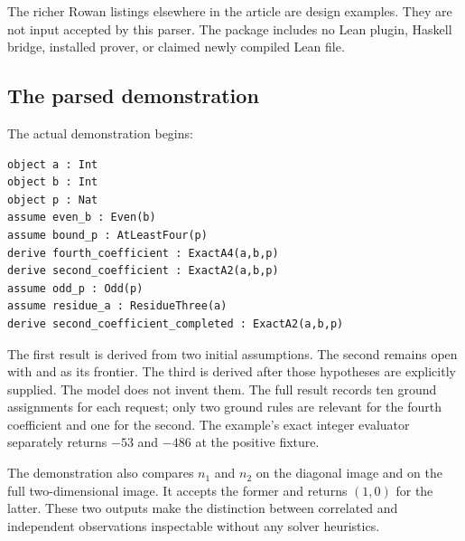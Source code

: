 \documentclass[11pt,letterpaper]{article}
\newcommand{\code}[1]{\texttt{\detokenize{#1}}}
\theoremstyle{definition}\newtheorem{definition}[theorem]{Definition}
\theoremstyle{remark}\newtheorem{remark}[theorem]{Remark}
\begin{document}
The richer Rowan listings elsewhere in the article are design examples.
They are not input accepted by this parser. The package includes no Lean
plugin, Haskell bridge, installed prover, or claimed newly compiled Lean file.

\subsection{The parsed demonstration}
The actual demonstration begins:
\begin{lstlisting}
object a : Int
object b : Int
object p : Nat
assume even_b : Even(b)
assume bound_p : AtLeastFour(p)
derive fourth_coefficient : ExactA4(a,b,p)
derive second_coefficient : ExactA2(a,b,p)
assume odd_p : Odd(p)
assume residue_a : ResidueThree(a)
derive second_coefficient_completed : ExactA2(a,b,p)
\end{lstlisting}

The first result is derived from two initial assumptions. The second remains
open with \code{Odd(p)} and \code{ResidueThree(a)} as its frontier. The third
is derived after those hypotheses are explicitly supplied. The model does
not invent them. The full result records ten ground assignments for each
request; only two ground rules are relevant for the fourth coefficient and
one for the second. The example's exact integer evaluator separately returns
$-53$ and $-486$ at the positive fixture.

The demonstration also compares $n_1$ and $n_2$ on the diagonal image and on
the full two-dimensional image. It accepts the former and returns $(1,0)$
for the latter. These two outputs make the distinction between correlated
and independent observations inspectable without any solver heuristics.
\end{document}

